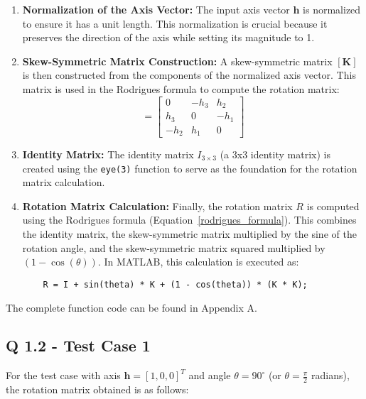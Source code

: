 \begin{enumerate}
    \item \textbf{Normalization of the Axis Vector:}
    The input axis vector \( \mathbf{h} \) is normalized to ensure it has a unit length. This normalization is crucial because it preserves the direction of the axis while setting its magnitude to 1.

    \item \textbf{Skew-Symmetric Matrix Construction:}
    A skew-symmetric matrix \( [\mathbf{K}] \) is then constructed from the components of the normalized axis vector. This matrix is used in the Rodrigues formula to compute the rotation matrix:
    \begin{equation}
    [\mathbf{K}] = \begin{bmatrix}
    0 & -h_3 & h_2 \\
    h_3 & 0 & -h_1 \\
    -h_2 & h_1 & 0
    \end{bmatrix}
    \end{equation}
    
    \item \textbf{Identity Matrix:}
    The identity matrix \( I_{3 \times 3} \) (a 3x3 identity matrix) is created using the \texttt{eye(3)} function to serve as the foundation for the rotation matrix calculation.
    
    \item \textbf{Rotation Matrix Calculation:}  
    Finally, the rotation matrix \( R \) is computed using the Rodrigues formula (Equation~\ref{rodrigues_formula}). This combines the identity matrix, the skew-symmetric matrix multiplied by the sine of the rotation angle, and the skew-symmetric matrix squared multiplied by \( (1 - \cos(\theta)) \). In MATLAB, this calculation is executed as:
    \begin{verbatim}
    R = I + sin(theta) * K + (1 - cos(theta)) * (K * K);
    \end{verbatim}
\end{enumerate}
The complete function code can be found in Appendix A.

\subsection{Q 1.2 -  Test Case 1}
For the test case with axis \( \mathbf{h} = [1, 0, 0]^T \) and angle \( \theta = 90^\circ \) (or \( \theta = \frac{\pi}{2} \) radians), the rotation matrix obtained is as follows:

